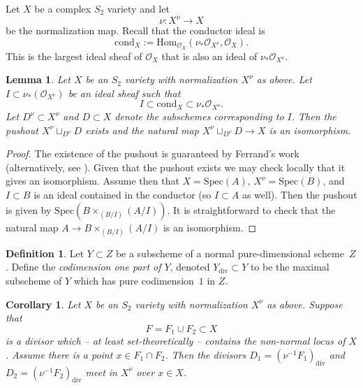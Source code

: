 \documentclass[JEP,XML,SOM,Unicode,NoFloatCountersInSection,published]{cedram}
\theoremstyle{plain}
\newtheorem{corollary}[theorem]{Corollary}
\newtheorem{lemma}[theorem]{Lemma}
\theoremstyle{definition}
\newtheorem{definition}[theorem]{Definition}
\newcommand\Oc{{\mathcal O}}
\newcommand\cond{{\mathrm{cond}}}
\newcommand\tdiv{{\mathrm{div}}}
\newcommand\Hom{{\mathrm{Hom}}}
\newcommand\Spec{{\mathrm{Spec}}}
\newcommand\cl{{\colon}}
\begin{document}
Let $X$ be a complex $S_2$ variety and let
\[
\nu \cl X^\nu \to X
\]
be the normalization map. Recall that the conductor ideal is
\[
\cond_X :=\Hom_{\Oc_X}(\nu_*\Oc_{X^\nu},\Oc_X).
\]
This is the largest ideal sheaf of $\Oc_X$ that is also an ideal of $\nu_*\Oc_{X^\nu}$.

\begin{lemma}
Let $X$ be an $S_2$ variety with normalization $X^\nu$ as above. Let $I\subset \nu_*(\Oc_{X^\nu})$ be an ideal sheaf such that
\[
I\subset \cond_X\subset \nu_*\Oc_{X^\nu}.
\]
Let $D^\nu \subset X^\nu$ and $D\subset X$ denote the subschemes corresponding to $I$. Then the pushout $X^\nu \sqcup_{D^\nu} D$ exists and the natural map $X^\nu \sqcup_{D^\nu} D\to X$ is an isomorphism.
\end{lemma}

\begin{proof}
The existence of the pushout is guaranteed by Ferrand's work \cite[Th.\,7.1]{Ferrand} (alternatively, see \cite[\href{https://stacks.math.columbia.edu/tag/0ECH}{Tag 0ECH}]{stacks-project}). Given that the pushout exists we may check locally that it gives an isomorphism. Assume then that $X=\Spec(A)$, $X^\nu = \Spec(B)$, and $I\subset B$ is an ideal contained in the conductor (so $I\subset A$ as well). Then the pushout is given by $\Spec(B\times_{(B/I)} (A/I))$. It is straightforward to check that the natural map $A\to B\times_{(B/I)} (A/I)$ is an isomorphism.
\end{proof}

\begin{definition}
Let $Y\subset Z$ be a subscheme of a normal pure-dimensional scheme~$Z$. Define the \textit{codimension one part of $Y$}, denoted $Y_\tdiv \subset Y$ to be the maximal subscheme of $Y$ which has pure codimension~$1$ in $Z$.
\end{definition}

\begin{corollary}\label{cor:pointaboveintpoint}
Let $X$ be an $S_2$ variety with normalization $X^\nu$ as above. Suppose that
\[
F=F_1\cup F_2\subset X
\]
is a divisor which -- at least set-theoretically -- contains the non-normal locus of $X$. Assume there is a point $x\in F_1\cap F_2$. Then the divisors $D_1 = (\nu^{-1}F_1)_\tdiv$ and $D_2 = (\nu^{-1}F_2)_\tdiv$ meet in $X^\nu$ over $x\in X$.
\end{corollary}
\end{document}
